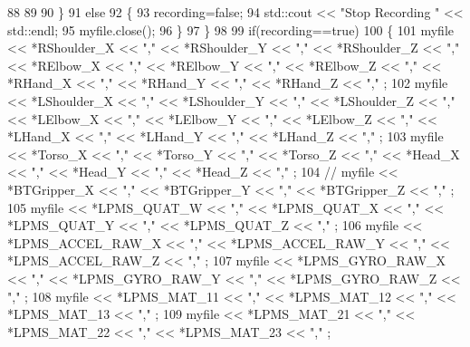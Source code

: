 \begin{DoxyCode}
88 
89 
90             \}
91             \textcolor{keywordflow}{else}
92             \{
93                 recording=\textcolor{keyword}{false};
94                 std::cout << \textcolor{stringliteral}{"Stop Recording "} << std::endl;
95                 myfile.close();
96             \}
97         \}
98 
99         \textcolor{keywordflow}{if}(recording==\textcolor{keyword}{true})
100         \{
101             myfile << *RShoulder\_X << \textcolor{stringliteral}{","} << *RShoulder\_Y << \textcolor{stringliteral}{","} << *RShoulder\_Z << \textcolor{stringliteral}{","} << *RElbow\_X << \textcolor{stringliteral}{","}
       << *RElbow\_Y << \textcolor{stringliteral}{","} << *RElbow\_Z  << \textcolor{stringliteral}{","} << *RHand\_X << \textcolor{stringliteral}{","} << *RHand\_Y << \textcolor{stringliteral}{","} << *RHand\_Z << \textcolor{stringliteral}{","} ;
102             myfile << *LShoulder\_X << \textcolor{stringliteral}{","} << *LShoulder\_Y << \textcolor{stringliteral}{","} << *LShoulder\_Z << \textcolor{stringliteral}{","} << *LElbow\_X << \textcolor{stringliteral}{","}
       << *LElbow\_Y << \textcolor{stringliteral}{","} << *LElbow\_Z  << \textcolor{stringliteral}{","} << *LHand\_X << \textcolor{stringliteral}{","} << *LHand\_Y << \textcolor{stringliteral}{","} << *LHand\_Z << \textcolor{stringliteral}{","} ;
103             myfile << *Torso\_X << \textcolor{stringliteral}{","} << *Torso\_Y << \textcolor{stringliteral}{","} << *Torso\_Z << \textcolor{stringliteral}{","} << *Head\_X << \textcolor{stringliteral}{","} << *Head\_Y <<
       \textcolor{stringliteral}{","} << *Head\_Z << \textcolor{stringliteral}{","} ;
104 \textcolor{comment}{//             myfile << *BTGripper\_X << "," << *BTGripper\_Y << "," << *BTGripper\_Z << "," ;}
105             myfile << *LPMS\_QUAT\_W << \textcolor{stringliteral}{","} << *LPMS\_QUAT\_X << \textcolor{stringliteral}{","} << *LPMS\_QUAT\_Y << \textcolor{stringliteral}{","} << *LPMS\_QUAT\_Z << \textcolor{stringliteral}{
      ","} ;
106             myfile << *LPMS\_ACCEL\_RAW\_X << \textcolor{stringliteral}{","} << *LPMS\_ACCEL\_RAW\_Y << \textcolor{stringliteral}{","} << *LPMS\_ACCEL\_RAW\_Z << \textcolor{stringliteral}{","} ;
107             myfile << *LPMS\_GYRO\_RAW\_X << \textcolor{stringliteral}{","} << *LPMS\_GYRO\_RAW\_Y << \textcolor{stringliteral}{","} << *LPMS\_GYRO\_RAW\_Z << \textcolor{stringliteral}{","} ;
108             myfile << *LPMS\_MAT\_11 << \textcolor{stringliteral}{","} << *LPMS\_MAT\_12 << \textcolor{stringliteral}{","} << *LPMS\_MAT\_13 << \textcolor{stringliteral}{","} ;
109             myfile << *LPMS\_MAT\_21 << \textcolor{stringliteral}{","} << *LPMS\_MAT\_22 << \textcolor{stringliteral}{","} << *LPMS\_MAT\_23 << \textcolor{stringliteral}{","} ;

\end{DoxyCode}
